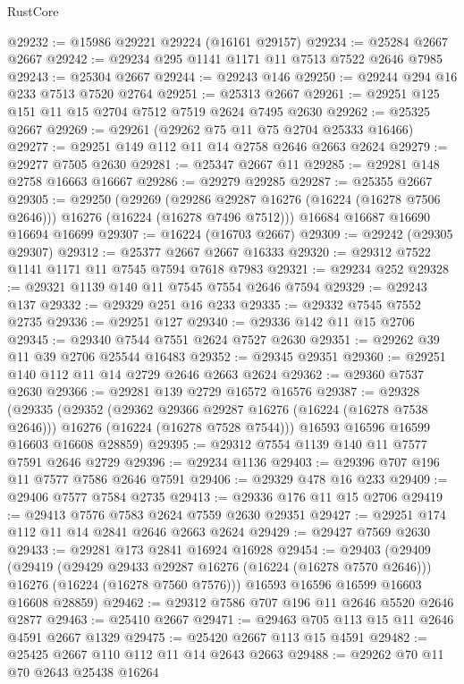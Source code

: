 \begin{lexlean}{RustCore}
\begin{coremodule}
@29232 := @15986 @29221 @29224 (@16161 @29157)
@29234 := @25284 @2667 @2667
@29242 := @29234 @295 @1141 @1171 @11 @7513 @7522 @2646 @7985
@29243 := @25304 @2667
@29244 := @29243 @146
@29250 := @29244 @294 @16 @233 @7513 @7520 @2764
@29251 := @25313 @2667
@29261 := @29251 @125 @151 @11 @15 @2704 @7512 @7519 @2624 @7495 @2630
@29262 := @25325 @2667
@29269 := @29261 (@29262 @75 @11 @75 @2704 @25333 @16466)
@29277 := @29251 @149 @112 @11 @14 @2758 @2646 @2663 @2624
@29279 := @29277 @7505 @2630
@29281 := @25347 @2667 @11
@29285 := @29281 @148 @2758 @16663 @16667
@29286 := @29279 @29285
@29287 := @25355 @2667
@29305 := @29250
    (@29269
      (@29286 @29287 @16276 (@16224 (@16278 @7506 @2646)))
      @16276
      (@16224 (@16278 @7496 @7512)))
    @16684
    @16687
    @16690
    @16694
    @16699
@29307 := @16224 (@16703 @2667)
@29309 := @29242 (@29305 @29307)
@29312 := @25377 @2667 @2667 @16333
@29320 := @29312 @7522 @1141 @1171 @11 @7545 @7594 @7618 @7983
@29321 := @29234 @252
@29328 := @29321 @1139 @140 @11 @7545 @7554 @2646 @7594
@29329 := @29243 @137
@29332 := @29329 @251 @16 @233
@29335 := @29332 @7545 @7552 @2735
@29336 := @29251 @127
@29340 := @29336 @142 @11 @15 @2706
@29345 := @29340 @7544 @7551 @2624 @7527 @2630
@29351 := @29262 @39 @11 @39 @2706 @25544 @16483
@29352 := @29345 @29351
@29360 := @29251 @140 @112 @11 @14 @2729 @2646 @2663 @2624
@29362 := @29360 @7537 @2630
@29366 := @29281 @139 @2729 @16572 @16576
@29387 := @29328
    (@29335
      (@29352
        (@29362 @29366 @29287 @16276 (@16224 (@16278 @7538 @2646)))
        @16276
        (@16224 (@16278 @7528 @7544)))
      @16593
      @16596
      @16599
      @16603
      @16608
      @28859)
@29395 := @29312 @7554 @1139 @140 @11 @7577 @7591 @2646 @2729
@29396 := @29234 @1136
@29403 := @29396 @707 @196 @11 @7577 @7586 @2646 @7591
@29406 := @29329 @478 @16 @233
@29409 := @29406 @7577 @7584 @2735
@29413 := @29336 @176 @11 @15 @2706
@29419 := @29413 @7576 @7583 @2624 @7559 @2630 @29351
@29427 := @29251 @174 @112 @11 @14 @2841 @2646 @2663 @2624
@29429 := @29427 @7569 @2630
@29433 := @29281 @173 @2841 @16924 @16928
@29454 := @29403
    (@29409
      (@29419
        (@29429 @29433 @29287 @16276 (@16224 (@16278 @7570 @2646)))
        @16276
        (@16224 (@16278 @7560 @7576)))
      @16593
      @16596
      @16599
      @16603
      @16608
      @28859)
@29462 := @29312 @7586 @707 @196 @11 @2646 @5520 @2646 @2877
@29463 := @25410 @2667
@29471 := @29463 @705 @113 @15 @11 @2646 @4591 @2667 @1329
@29475 := @25420 @2667 @113 @15 @4591
@29482 := @25425 @2667 @110 @112 @11 @14 @2643 @2663
@29488 := @29262 @70 @11 @70 @2643 @25438 @16264

\end{coremodule}
\end{lexlean}
